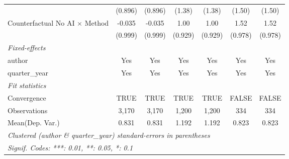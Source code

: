 \begin{tabular}{lcccccc}
                                         & (0.896)       & (0.896)       & (1.38)        & (1.38)        & (1.50)        & (1.50)\\   
   Counterfactual No AI $\times$ Method  & -0.035        & -0.035        & 1.00          & 1.00          & 1.52          & 1.52\\   
                                         & (0.999)       & (0.999)       & (0.929)       & (0.929)       & (0.978)       & (0.978)\\   
   \midrule
   \emph{Fixed-effects}\\
   author                                & Yes           & Yes           & Yes           & Yes           & Yes           & Yes\\  
   quarter\_year                         & Yes           & Yes           & Yes           & Yes           & Yes           & Yes\\  
   \midrule
   \emph{Fit statistics}\\
   Convergence                           &TRUE           & TRUE          & TRUE          & TRUE          & FALSE         & FALSE\\  
   Observations                          & 3,170         & 3,170         & 1,200         & 1,200         & 334           & 334\\  
Mean(Dep. Var.) & 0.831 & 0.831 & 1.192 & 1.192 & 0.823 & 0.823 \\
   \midrule \midrule
   \multicolumn{7}{l}{\emph{Clustered (author \& quarter\_year) standard-errors in parentheses}}\\
   \multicolumn{7}{l}{\emph{Signif. Codes: ***: 0.01, **: 0.05, *: 0.1}}\\
\end{tabular}
\par\endgroup
